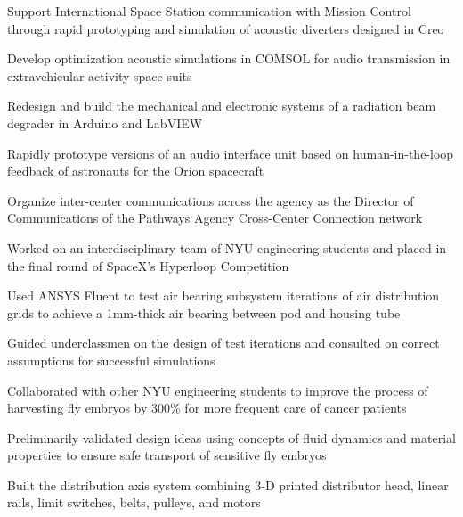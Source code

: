 \documentclass[]{deedy-resume-openfont}
\begin{document}
\begin{minipage}[t]{0.66\textwidth}
\begin{tightemize}
\item Support International Space Station communication with Mission Control through rapid prototyping and simulation of acoustic diverters designed in Creo
\item Develop optimization acoustic simulations in COMSOL for audio transmission in extravehicular activity space suits
\item Redesign and build the mechanical and electronic systems of a radiation beam degrader in Arduino and LabVIEW
\item Rapidly prototype versions of an audio interface unit based on human-in-the-loop feedback of astronauts for the Orion spacecraft
\item Organize inter-center communications across the agency as the Director of Communications of the Pathways Agency Cross-Center Connection network
\end{tightemize}
\sectionsep

\begin{tightemize}
\item Worked on an interdisciplinary team of NYU engineering students and placed in the final round of SpaceX's Hyperloop Competition
\item Used ANSYS Fluent to test air bearing subsystem iterations of air distribution grids to achieve a 1mm-thick air bearing between pod and housing tube
\item Guided underclassmen on the design of test iterations and consulted on correct assumptions for successful simulations
\end{tightemize}
\sectionsep

\begin{tightemize}
\item Collaborated with other NYU engineering students to improve the process of harvesting fly embryos by 300{\% }for more frequent care of cancer patients
\item Preliminarily validated design ideas using concepts of fluid dynamics and material properties to ensure safe transport of sensitive fly embryos
\item Built the distribution axis system combining 3-D printed distributor head, linear rails, limit switches, belts, pulleys, and motors
\end{tightemize}
\sectionsep




\end{minipage} 
\end{document}
